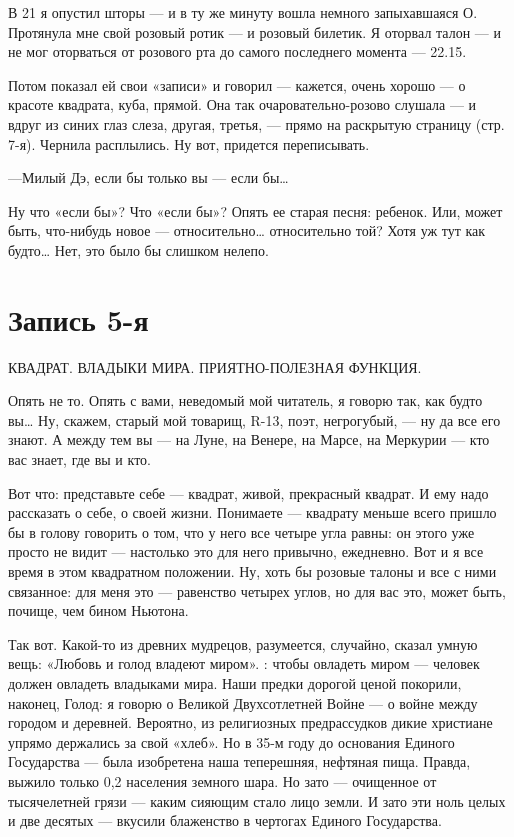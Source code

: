 \documentclass[11pt,openany]{book}
\newcommand{\bookchapterplain}[1]{%
  \clearpage\phantomsection\chapter*{#1}%
  \addcontentsline{toc}{chapter}{#1}\markboth{#1}{#1}\thispagestyle{plain}}
\begin{document}
В 21 я опустил шторы --- и в ту же минуту вошла немного запыхавшаяся О. Протянула мне свой розовый ротик --- и розовый билетик. Я оторвал талон --- и не мог оторваться от розового рта до самого последнего момента --- 22.15.

Потом показал ей свои «записи» и говорил --- кажется, очень хорошо --- о красоте квадрата, куба, прямой. Она так очаровательно-розово слушала --- и вдруг из синих глаз слеза, другая, третья, --- прямо на раскрытую страницу (стр. 7-я). Чернила расплылись. Ну вот, придется переписывать.

---Милый Дэ, если бы только вы --- если бы\ldots{}

Ну что «если бы»? Что «если бы»? Опять ее старая песня: ребенок. Или, может быть, что-нибудь новое --- относительно\ldots{} относительно той? Хотя уж тут как будто\ldots{} Нет, это было бы слишком нелепо.

\bookchapterplain{Запись 5-я}

\begin{center}\textsc{КВАДРАТ. ВЛАДЫКИ МИРА. ПРИЯТНО-ПОЛЕЗНАЯ ФУНКЦИЯ.}\end{center}

Опять не то. Опять с вами, неведомый мой читатель, я говорю так, как будто вы\ldots{} Ну, скажем, старый мой товарищ, R-13, поэт, негрогубый, --- ну да все его знают. А между тем вы --- на Луне, на Венере, на Марсе, на Меркурии --- кто вас знает, где вы и кто.

Вот что: представьте себе --- квадрат, живой, прекрасный квадрат. И ему надо рассказать о себе, о своей жизни. Понимаете --- квадрату меньше всего пришло бы в голову говорить о том, что у него все четыре угла равны: он этого уже просто не видит --- настолько это для него привычно, ежедневно. Вот и я все время в этом квадратном положении. Ну, хоть бы розовые талоны и все с ними связанное: для меня это --- равенство четырех углов, но для вас это, может быть, почище, чем бином Ньютона.

Так вот. Какой-то из древних мудрецов, разумеется, случайно, сказал умную вещь: «Любовь и голод владеют миром». : чтобы овладеть миром --- человек должен овладеть владыками мира. Наши предки дорогой ценой покорили, наконец, Голод: я говорю о Великой Двухсотлетней Войне --- о войне между городом и деревней. Вероятно, из религиозных предрассудков дикие христиане упрямо держались за свой «хлеб». Но в 35-м году до основания Единого Государства --- была изобретена наша теперешняя, нефтяная пища. Правда, выжило только 0,2 населения земного шара. Но зато --- очищенное от тысячелетней грязи --- каким сияющим стало лицо земли. И зато эти ноль целых и две десятых --- вкусили блаженство в чертогах Единого Государства.
\end{document}
